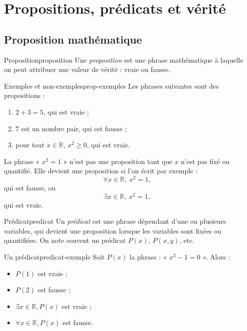 \documentclass[11pt,a4paper]{article}
\newcommand{\R}{\mathbb{R}}
\begin{document}
\section{Propositions, prédicats et vérité}

\subsection{Proposition mathématique}

\begin{definitionbox}{Proposition}{proposition}
Une \emph{proposition} est une phrase mathématique à laquelle on peut attribuer une valeur de vérité : vraie ou fausse.
\end{definitionbox}

\begin{exemplebox}{Exemples et non-exemples}{prop-exemples}
Les phrases suivantes sont des propositions :
\begin{enumerate}
  \item $2+3=5$, qui est vraie ;
  \item $7$ est un nombre pair, qui est fausse ;
  \item pour tout $x\in\R$, $x^2\geq 0$, qui est vraie.
\end{enumerate}
La phrase « $x^2=1$ » n'est pas une proposition tant que $x$ n'est pas fixé ou quantifié. Elle devient une proposition si l'on écrit par exemple :
\[
\forall x\in\R,\ x^2=1,
\]
qui est fausse, ou
\[
\exists x\in\R,\ x^2=1,
\]
qui est vraie.
\end{exemplebox}

\begin{definitionbox}{Prédicat}{predicat}
Un \emph{prédicat} est une phrase dépendant d'une ou plusieurs variables, qui devient une proposition lorsque les variables sont fixées ou quantifiées. On note souvent un prédicat $P(x)$, $P(x,y)$, etc.
\end{definitionbox}

\begin{exemplebox}{Un prédicat}{predicat-exemple}
Soit $P(x)$ la phrase : « $x^2-1=0$ ». Alors :
\begin{itemize}
  \item $P(1)$ est vraie ;
  \item $P(2)$ est fausse ;
  \item $\exists x\in\R, P(x)$ est vraie ;
  \item $\forall x\in\R, P(x)$ est fausse.
\end{itemize}
\end{exemplebox}
\end{document}
